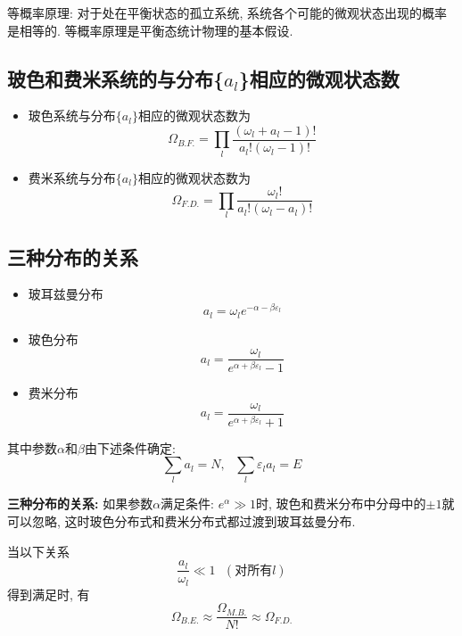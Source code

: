 等概率原理: 对于处在平衡状态的孤立系统, 系统各个可能的微观状态出现的概率是相等的. 等概率原理是平衡态统计物理的基本假设.

\subsection{玻色和费米系统的与分布\texorpdfstring{\{$a_l$\}}{{al}}相应的微观状态数}
\begin{itemize}
    \item 玻色系统与分布$\{a_l\}$相应的微观状态数为
          $$
              \Omega_{B.F.}=\prod_l\frac{(\omega_l+a_l-1)!}{a_l!(\omega_l-1)!}
          $$
    \item 费米系统与分布$\{a_l\}$相应的微观状态数为
          $$
              \Omega_{F.D.}=\prod_l\frac{\omega_l!}{a_l!(\omega_l-a_l)!}
          $$
\end{itemize}

\subsection{三种分布的关系}

\begin{itemize}
    \item 玻耳兹曼分布
          $$
              a_l=\omega_le^{-\alpha-\beta\varepsilon_l}
          $$
    \item 玻色分布
          $$
              a_l=\frac{\omega_l}{e^{\alpha+\beta\varepsilon_l}-1}
          $$
    \item 费米分布
          $$
              a_l=\frac{\omega_l}{e^{\alpha+\beta\varepsilon_l}+1}
          $$
\end{itemize}

其中参数$\alpha$和$\beta$由下述条件确定:
$$
    \sum_la_l=N, \ \ \ \sum_l\varepsilon_la_l=E
$$

\textbf{三种分布的关系:}
如果参数$\alpha$满足条件: $e^\alpha\gg1$时, 玻色和费米分布中分母中的$\pm1$就可以忽略, 这时玻色分布式和费米分布式都过渡到玻耳兹曼分布.

当以下关系
$$\frac{a_l}{\omega_l}\ll1 \ \ \ (\mathrm{对所有}l)$$
得到满足时, 有
$$
    \Omega_{B.E.}\approx\frac{\Omega_{M.B.}}{N!}\approx\Omega_{F.D.}
$$
